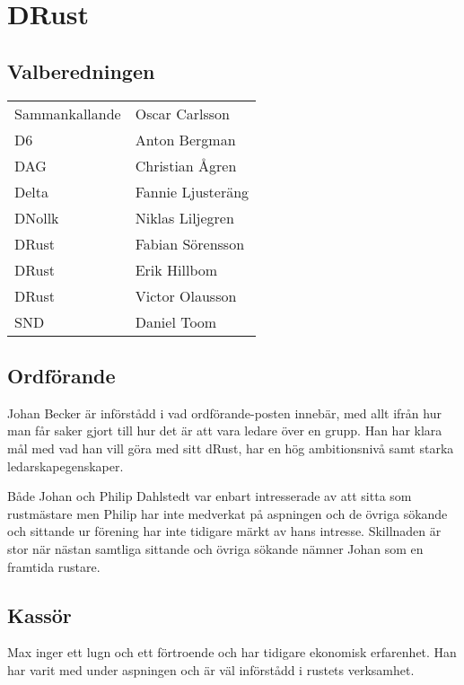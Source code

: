 \section{DRust}

\subsection{Valberedningen}
\begin{autoframe}

\begin{tabular}{ll}
Sammankallande & Oscar Carlsson \\
D6 & Anton Bergman \\
DAG  & Christian Ågren \\
Delta  & Fannie Ljusteräng \\
DNollk & Niklas Liljegren \\
DRust & Fabian Sörensson \\
DRust & Erik Hillbom \\
DRust & Victor Olausson \\
SND  & Daniel Toom
\end{tabular}

\end{autoframe}


\subsection{Ordförande}
\begin{autoframe}

Johan Becker är införstådd i vad ordförande-posten innebär, med allt ifrån hur man får saker gjort till hur det är att vara ledare över en grupp.  Han har klara mål med vad han vill göra med sitt dRust, har en hög ambitionsnivå samt starka ledarskapegenskaper.

\bigskip
Både Johan och Philip Dahlstedt var enbart intresserade av att sitta som rustmästare men Philip har inte medverkat på aspningen och de övriga sökande och sittande ur förening har inte tidigare märkt av hans intresse. Skillnaden är stor när nästan samtliga sittande och övriga sökande nämner Johan som en framtida rustare.
\end{autoframe}

\subsection{Kassör}
\begin{autoframe}

Max inger ett lugn och ett förtroende och har tidigare ekonomisk erfarenhet. Han har varit med under aspningen och är väl införstådd i rustets verksamhet.
\end{autoframe}

